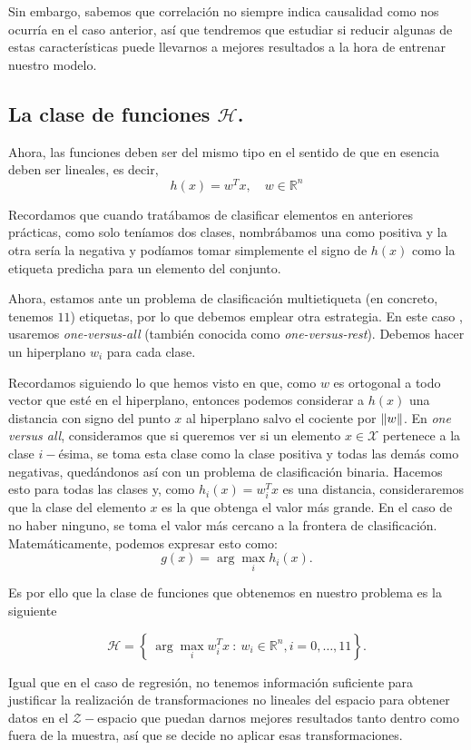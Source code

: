 \documentclass[a4paper, 20pt]{article}
\newcommand{\R}{\mathbb R}
\begin{document}
Sin embargo, sabemos que correlación no siempre indica causalidad como nos ocurría en el caso anterior, así que tendremos que estudiar si reducir algunas de estas características puede llevarnos a mejores resultados a la hora de entrenar nuestro modelo.


\subsection{La clase de funciones $\mathcal H$.}


Ahora, las funciones deben ser del mismo tipo en el sentido de que en esencia deben ser lineales, es decir,
$$
h(x) = w^T x, \quad w \in \R^n
$$

Recordamos que cuando tratábamos de clasificar elementos en anteriores prácticas, como solo teníamos dos clases, nombrábamos una como positiva y la otra sería la negativa y podíamos tomar simplemente el signo de $h(x)$ como la etiqueta predicha para un elemento del conjunto. 

Ahora, estamos ante un problema de clasificación multietiqueta (en concreto, tenemos $11$) etiquetas, por lo que debemos emplear otra estrategia. En este caso , usaremos \emph{one-versus-all} (también conocida como \emph{one-versus-rest}). Debemos hacer un hiperplano $w_i$ para cada clase. 

Recordamos siguiendo lo que hemos visto en \cite{learn_from_data} que, como $w$ es ortogonal a todo vector que esté en el hiperplano, entonces podemos considerar a $h(x)$ una distancia con signo del punto $x$ al hiperplano salvo el cociente por $\norm{w}$. En \emph{one versus all}, consideramos que si queremos ver si un elemento $x \in \mathcal X$ pertenece a la clase $i-$ésima, se toma esta clase como la clase positiva y todas las demás como negativas, quedándonos así con un problema de clasificación binaria. Hacemos esto para todas las clases y, como $h_i(x) = w_i^T x$ es una distancia, consideraremos que la clase del elemento $x$ es la que obtenga el valor más grande. En el caso de no haber ninguno, se toma el valor más cercano a la frontera de clasificación. Matemáticamente, podemos expresar esto como:
$$
g(x) = \arg \max_i h_i(x).
$$

Es por ello que la clase de funciones que obtenemos en nuestro problema es la siguiente

$$
\mathcal H = \left\{ \ \arg \max_i w_i^T x  \ : \ w_i \in \R^n, i = 0,\dots,11\right\}.
$$

Igual que en el caso de regresión, no tenemos información suficiente para justificar la realización de transformaciones no lineales del espacio para obtener datos en el $\mathcal Z-$espacio que puedan darnos mejores resultados tanto dentro como fuera de la muestra, así que se decide no aplicar esas transformaciones.
\end{document}
